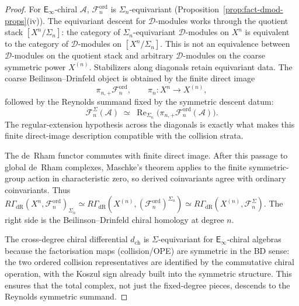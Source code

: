 \documentclass[11pt,reqno]{amsart}
\theoremstyle{definition}
\theoremstyle{remark}
\newcommand{\cA}{\mathcal{A}}
\newcommand{\cD}{\mathcal{D}}
\newcommand{\cF}{\mathcal{F}}
\newcommand{\Einf}{\mathsf{E}_{\infty}}
\numberwithin{equation}{section}
\begin{document}
\begin{proof}
For $\Einf$-chiral $\cA$,
$\cF_n^{\mathrm{ord}}$ is $\Sigma_n$-equivariant
(Proposition~\ref{prop:fact-dmod-props}(iv)).
The equivariant descent for $\cD$-modules works through the
quotient stack $[X^n / \Sigma_n]$: the category of
$\Sigma_n$-equivariant $\cD$-modules on $X^n$ is equivalent
to the category of $\cD$-modules on $[X^n / \Sigma_n]$.
This is not an equivalence between $\cD$-modules on the quotient stack
and arbitrary $\cD$-modules on the coarse symmetric power
$X^{(n)}$.  Stabilizers along diagonals retain equivariant data.
The coarse Beilinson--Drinfeld object is obtained by the finite direct
image
\[
\pi_{n,+}\cF_n^{\mathrm{ord}},
\qquad
\pi_n\colon X^n\longrightarrow X^{(n)},
\]
followed by the Reynolds summand fixed by the symmetric descent datum:
\[
\cF_n^{\Sigma}(\cA)
\;\simeq\;
\operatorname{Re}_{\Sigma_n}
\bigl(\pi_{n,+}\cF_n^{\mathrm{ord}}(\cA)\bigr).
\]
The regular-extension hypothesis across the diagonals is exactly what
makes this finite direct-image description compatible with the
collision strata.

The de~Rham functor commutes with finite direct image.  After this
passage to global de~Rham complexes, Maschke's theorem applies to the
finite symmetric-group action in characteristic zero, so
derived coinvariants agree with ordinary coinvariants.  Thus
$R\Gamma_{\mathrm{dR}}(X^n,
\cF_n^{\mathrm{ord}})_{\Sigma_n}
\simeq
R\Gamma_{\mathrm{dR}}(X^{(n)},
(\cF_n^{\mathrm{ord}})^{\Sigma_n})
\simeq
R\Gamma_{\mathrm{dR}}(X^{(n)},
\cF_n^{\Sigma})$.
The right side is the Beilinson--Drinfeld chiral
homology at degree $n$.

The cross-degree chiral differential $d_{\mathrm{ch}}$
is $\Sigma$-equivariant for $\Einf$-chiral algebras
because the factorisation maps (collision/OPE) are
symmetric in the BD sense: the two ordered collision representatives
are identified by the commutative chiral operation, with the Koszul
sign already built into the symmetric structure. This ensures that
the total complex, not just the fixed-degree pieces, descends to the
Reynolds symmetric summand.
\end{proof}
\end{document}
